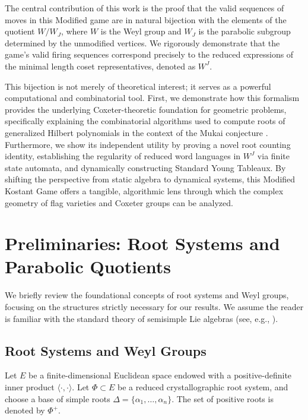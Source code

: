 \documentclass[11pt,a4paper]{amsart}
\theoremstyle{plain}
\theoremstyle{definition}
\theoremstyle{remark}
\begin{document}
The central contribution of this work is the proof that the valid sequences of moves in this Modified game are in natural bijection with the elements of the quotient $W/W_J$, where $W$ is the Weyl group and $W_J$ is the parabolic subgroup determined by the unmodified vertices. We rigorously demonstrate that the game's valid firing sequences correspond precisely to the reduced expressions of the minimal length coset representatives, denoted as $W^J$.

This bijection is not merely of theoretical interest; it serves as a powerful computational and combinatorial tool. First, we demonstrate how this formalism provides the underlying Coxeter-theoretic foundation for geometric problems, specifically explaining the combinatorial algorithms used to compute roots of generalized Hilbert polynomials in the context of the Mukai conjecture \cite{CaviedesCastro2022}. Furthermore, we show its independent utility by proving a novel root counting identity, establishing the regularity of reduced word languages in $W^J$ via finite state automata, and dynamically constructing Standard Young Tableaux. By shifting the perspective from static algebra to dynamical systems, this Modified Kostant Game offers a tangible, algorithmic lens through which the complex geometry of flag varieties and Coxeter groups can be analyzed.

\section{Preliminaries: Root Systems and Parabolic Quotients}
\label{sec:prelim}

We briefly review the foundational concepts of root systems and Weyl groups, focusing on the structures strictly necessary for our results. We assume the reader is familiar with the standard theory of semisimple Lie algebras (see, e.g., \cite{Humphreys1972, BjornerBrenti2005}).


\subsection{Root Systems and Weyl Groups}

Let $E$ be a finite-dimensional Euclidean space endowed with a positive-definite inner product $\langle \cdot, \cdot\rangle$. Let $\Phi \subset E$ be a reduced crystallographic root system, and choose a base of simple roots $\Delta = \{\alpha_1, \dots, \alpha_n\}$. The set of positive roots is denoted by $\Phi^+$. 
\end{document}
